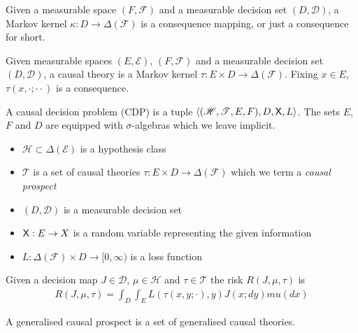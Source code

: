 \begin{definition}[Consequences]
Given a measurable space $(F,\mathcal{F})$ and a measurable decision set $(D,\mathcal{D})$, a Markov kernel $\kappa:D \to \Delta(\mathcal{F})$ is a consequence mapping, or just a consequence for short.
\end{definition}

\begin{definition}\label{def:causal_theory}
Given measurable spaces $(E,\mathcal{E})$, $(F,\mathcal{F})$ and a measurable decision set $(D,\mathcal{D})$, a causal theory is a Markov kernel $\tau:E\times D \to \Delta(\mathcal{F})$. Fixing $x\in E$, $\tau(x,\cdot;\cdot\cdot)$ is a consequence.
\end{definition}

\begin{definition}
A causal decision problem (CDP) is a tuple $\langle (\mathscr{H}, \mathscr{T}, E, F), D, \mathsf{X}, L \rangle$. The sets $E$, $F$ and $D$ are equipped with $\sigma$-algebras which we leave implicit.

\begin{itemize}
    \item $\mathscr{H}\subset \Delta(\mathcal{E})$ is a hypothesis class
    \item $\mathscr{T}$ is a set of causal theories $\tau:E\times D\to \Delta(\mathcal{F})$ which we term a \emph{causal prospect}
    \item $(D,\mathcal{D})$ is a measurable decision set
    \item $\mathsf{X}:E\to X$ is a random variable representing the given information
    \item $L:\Delta(\mathcal{F})\times D\to [0,\infty)$ is a loss function
\end{itemize}

Given a decision map $J\in\mathscr{D}$, $\mu\in \mathscr{H}$ and $\tau\in \mathscr{T}$ the risk $R(J,\mu,\tau)$ is
\begin{align}
    R(J,\mu,\tau) = \int_D\int_E L(\tau(x,y; \cdot), y) J(x;dy) mu(dx)
\end{align}
\end{definition}




\begin{definition}\label{def:gen_causal_prospect}
A generalised causal prospect is a set of generalised causal theories.
\end{definition}

